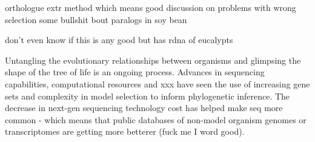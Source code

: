 \documentclass[12pt]{article}
\begin{document}

\cite{yang2014orthology} orthologue extr method which means good discussion on problems with wrong selection
\cite{degnan2009gene} some bullshit bout paralogs in soy bean

\cite{ochieng2007nuclear}  don't even know if this is any good but has rdna of eucalypts


Untangling the evolutionary relationships between organisms and glimpsing the shape of the tree of life is an ongoing process. 
Advances in sequencing capabilities, computational resources and xxx have seen the use of increasing gene sets and complexity in model selection to inform phylogenetic inference. 
The decrease in next-gen sequencing technology cost has helped make seq more common - which means that public databases of non-model organism genomes or transcriptomes are getting more betterer (fuck me I word good).
\end{document}

